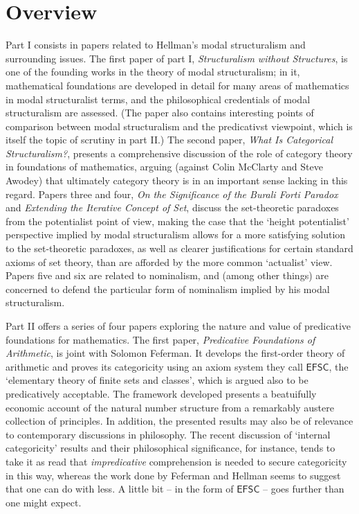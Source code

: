 \documentclass{asl}
\theoremstyle{definition}
\begin{document}
\section{Overview}
Part I consists in papers related to Hellman's modal structuralism and surrounding issues.
The first paper of part I, \emph{Structuralism without Structures}, 
is one of the founding works in the theory of modal structuralism;
in it, mathematical foundations are developed in detail for many areas of mathematics
in modal structuralist terms, and the philosophical credentials of modal structuralism are assessed.
(The paper also contains interesting points of comparison between modal structuralism and the predicativst viewpoint, 
which is itself the topic of scrutiny in part II.) 
The second paper, 
\emph{What Is Categorical Structuralism?}, 
presents a comprehensive discussion of the role of category theory in foundations of mathematics, 
arguing 
(against Colin McClarty and Steve Awodey) 
that ultimately category theory is in an important sense lacking in this regard. 
Papers three and four, 
\emph{On the Significance of the Burali Forti Paradox} 
and \emph{Extending the Iterative Concept of Set}, 
discuss the set-theoretic paradoxes from the potentialist point of view, 
making the case that the `height potentialist' perspective implied by modal structuralism allows for a more satisfying solution 
to the set-theoretic paradoxes,
 as well as clearer justifications for certain standard axioms of set theory, 
than are afforded by the more common `actualist' view. 
Papers five and six are related to nominalism, 
and (among other things) are concerned to defend the particular form of nominalism implied by his modal structuralism.

Part II offers a series of four papers 
exploring the nature and value of predicative foundations for mathematics. 
The first paper, \emph{Predicative Foundations of Arithmetic}, 
is joint with Solomon Feferman. 
It develops the first-order theory of arithmetic and proves its categoricity 
using an axiom system they call $\mathsf{EFSC}$, 
the `elementary theory of finite sets and classes',
which is argued also to be predicatively acceptable.
The framework developed presents a beatuifully economic account 
of the natural number structure from a remarkably austere collection of principles. 
In addition, the presented results may also be of relevance to contemporary discussions in philosophy.
The recent discussion of `internal categoricity' results and their philosophical significance, 
for instance, 
tends to take it as read that \emph{impredicative} comprehension is needed
to secure categoricity in this way, 
whereas the work done by Feferman and Hellman
seems to suggest that one can do with less.
A little bit -- 
in the form of $\mathsf{EFSC}$ -- 
goes further than one might expect. 
\end{document}
